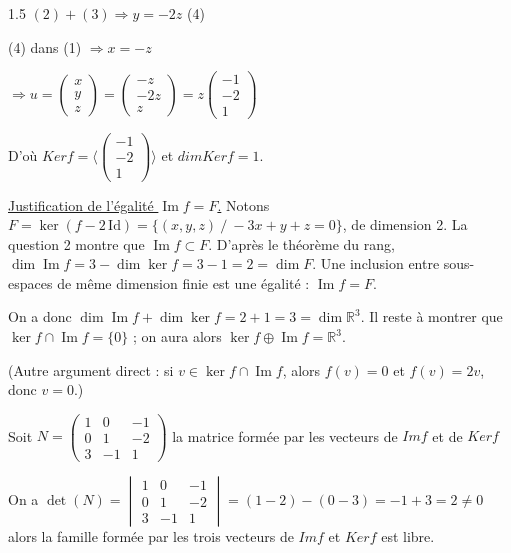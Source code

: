 \documentclass[12pt]{article}
\begin{document}
\begin{spacing}{1.5}
$(2)+(3)\Rightarrow y=-2z$ (4)

(4) dans (1) $\Rightarrow x=-z$

$\Rightarrow u=\begin{pmatrix}
x\\
y\\
z
\end{pmatrix}=\begin{pmatrix}
-z\\
-2z\\
z
\end{pmatrix}=z\begin{pmatrix}
-1 \\
-2 \\
1
\end{pmatrix}$

D'où $Kerf=\langle \begin{pmatrix}
-1\\
-2\\
1
\end{pmatrix}\rangle$ et $dimKerf=1$.

\medskip
\underline{Justification de l'égalité $\operatorname{Im}f=F$.} Notons $F=\ker(f-2\,\mathrm{Id})=\{(x,y,z)\ /\ -3x+y+z=0\}$, de dimension 2. La question 2 montre que $\operatorname{Im}f\subset F$. D'après le théorème du rang, $\dim\operatorname{Im}f=3-\dim\ker f=3-1=2=\dim F$. Une inclusion entre sous-espaces de même dimension finie est une égalité : $\operatorname{Im}f=F$.

On a donc $\dim\operatorname{Im}f+\dim\ker f=2+1=3=\dim\mathbb{R}^3$. Il reste à montrer que $\ker f\cap\operatorname{Im}f=\{0\}$ ; on aura alors $\ker f\oplus\operatorname{Im}f=\mathbb{R}^3$.

(Autre argument direct : si $v\in\ker f\cap\operatorname{Im}f$, alors $f(v)=0$ et $f(v)=2v$, donc $v=0$.)

\medskip
Soit $N=\begin{pmatrix}
1 & 0  & -1 \\ 
0 & 1  & -2 \\ 
3 & -1 & 1 
\end{pmatrix}$ la matrice formée par les vecteurs de $Imf$ et de $Kerf$

On a $\det(N)=\begin{vmatrix}
1 & 0  & -1 \\ 
0 & 1  & -2 \\ 
3 & -1 & 1 
\end{vmatrix}=(1-2)-(0-3)=-1+3=2\neq 0$ alors la famille formée par les trois vecteurs de $Imf$ et $Kerf$ est libre.


\end{spacing}
\end{document}

